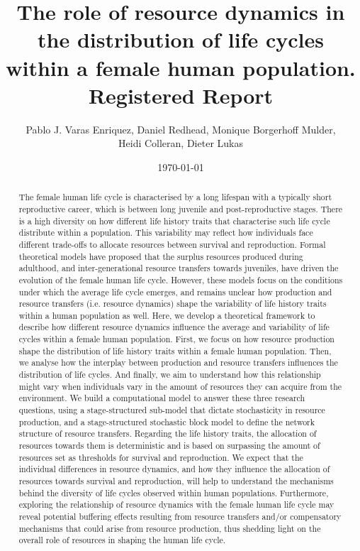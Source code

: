 \documentclass{article}
\title{The role of resource dynamics in the distribution of life cycles within a female human population.
\\
Registered Report}
\author{Pablo J. Varas Enriquez, Daniel Redhead, Monique Borgerhoff Mulder,
\\
Heidi Colleran, Dieter Lukas}
\date{\today}
\begin{document}
\maketitle

\tableofcontents

\begin{abstract}
    The female human life cycle is characterised by a long lifespan with a typically short reproductive career, which is between long juvenile and post-reproductive stages. There is a high diversity on how different life history traits that characterise such life cycle distribute within a population. This variability may reflect how individuals face different trade-offs to allocate resources between survival and reproduction. Formal theoretical models have proposed that the surplus resources produced during adulthood, and inter-generational resource transfers towards juveniles, have driven the evolution of the female human life cycle. However, these models focus on the conditions under which the average life cycle emerges, and remains unclear how production and resource transfers (i.e. resource dynamics) shape the variability of life history traits within a human population as well. Here, we develop a theoretical framework to describe how different resource dynamics influence the average and variability of life cycles within a female human population. First, we focus on how resource production shape the distribution of life history traits within a female human population. Then, we analyse how the interplay between production and resource transfers influences the distribution of life cycles. And finally, we aim to understand how this relationship might vary when individuals vary in the amount of resources they can acquire from the environment. We build a computational model to answer these three research questions, using a stage-structured sub-model that dictate stochasticity in resource production, and a stage-structured stochastic block model to define the network structure of resource transfers. Regarding the life history traits, the allocation of resources towards them is deterministic and is based on surpassing the amount of resources set as thresholds for survival and reproduction. We expect that the individual differences in resource dynamics, and how they influence the allocation of resources towards survival and reproduction, will help to understand the mechanisms behind the diversity of life cycles observed within human populations. Furthermore, exploring the relationship of resource dynamics with the female human life cycle may reveal potential buffering effects resulting from resource transfers and/or compensatory mechanisms that could arise from resource production, thus shedding light on the overall role of resources in shaping the human life cycle.
\end{abstract}
\end{document}
